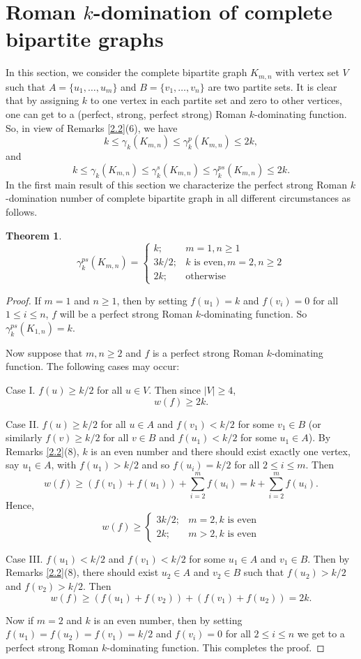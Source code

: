 \documentclass[12pt]{amsart}
\newtheorem{theorem}{Theorem}[section]
\begin{document}
\section{Roman $k$-domination of complete bipartite graphs}
In this section, we consider the complete bipartite graph $K_{m,n}$ with vertex set $V$ such that $A=\{u_1, \dots , u_m\}$ and $B=\{v_1, \dots , v_n\}$ are two partite sets. It is clear that by assigning $k$ to one vertex in each partite set and zero to other vertices, one can get to a (perfect, strong, perfect strong) Roman $k$-dominating function. So, in view of Remarks \ref{2.2}(6), we have
$$k\leq \gamma_k(K_{m,n})\leq \gamma_k^p(K_{m,n})\leq 2k,$$
and
$$k\leq \gamma_k(K_{m,n})\leq  \gamma_k^s(K_{m,n})\leq \gamma_k^{ps}(K_{m,n}) \leq 2k.$$
In the first main result of this section we characterize the perfect strong Roman $k$-domination number of complete bipartite graph in all different circumstances as follows.
\begin{theorem}\label{thm1}
$$\gamma_k^{ps}(K_{m,n})=\left\lbrace \begin{array}{ll}
k; & m=1, n\geq 1 \\ 
3k/2; & k \textrm{ is even}, m=2, n\geq 2 \\ 
2k; & \textrm{otherwise} 
\end{array} \right.$$
\end{theorem}
\begin{proof}
If $m=1$ and $n\geq 1$, then by setting $f(u_1)=k$ and $f(v_i)=0$ for all $1\leq i \leq n$, $f$ will be a perfect strong Roman $k$-dominating function. So $\gamma_k^{ps}(K_{1,n})=k$. 

 Now suppose that $m,n\geq 2$ and $f$ is a perfect strong Roman $k$-dominating function. The following cases may occur:


Case I. $f(u)\geq k/2$ for all $u\in V$. Then since $|V|\geq 4$, 
$$w(f)\geq 2k.$$

Case II. $f(u)\geq k/2$ for all $u\in A$ and $f(v_1)<k/2$ for some $v_1\in B$ (or similarly $f(v)\geq k/2$ for all $v\in B$ and $f(u_1)<k/2$ for some $u_1\in A$).
By Remarks \ref{2.2}(8), $k$ is an even number and there should exist exactly one vertex, say $u_1\in A$, with $f(u_1)>k/2$ and so $f(u_i)=k/2$ for all $2\leq i \leq m$. Then 
$$w(f)\geq (f(v_1)+f(u_1))+\sum_{i=2}^mf(u_i)=k+\sum_{i=2}^mf(u_i).$$
Hence, 
$$w(f)\geq \left\lbrace\begin{array}{ll}
3k/2; & m=2, k \textrm{ is even} \\ 
2k; & m>2, k \textrm{ is even}
\end{array} \right.$$ 

Case III. $f(u_1)<k/2$ and $f(v_1)<k/2$ for some $u_1\in A$ and $v_1\in B$. Then by Remarks \ref{2.2}(8), there should exist $u_2\in A$ and $v_2\in B$ such that $f(u_2)>k/2$ and $f(v_2)>k/2$. Then
$$w(f)\geq (f(u_1)+f(v_2)) +(f(v_1)+f(u_2))=2k.$$

Now if $m=2$ and $k$ is an even number, then by setting $f(u_1)=f(u_2)=f(v_1)=k/2$  and $f(v_i)=0$ for all $2\leq i \leq n$ we get to a perfect strong Roman $k$-dominating function. This completes the proof.
\end{proof}
\end{document}
